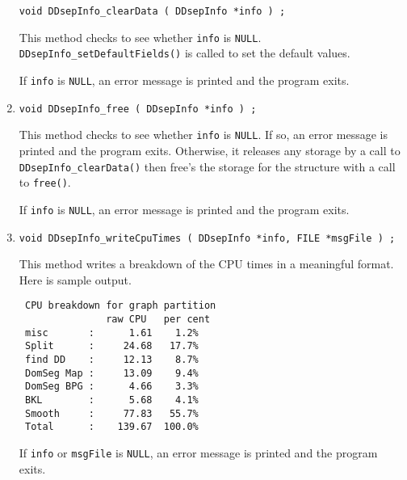 \begin{enumerate}
\begin{verbatim}
void DDsepInfo_clearData ( DDsepInfo *info ) ;
\end{verbatim}
This method checks to see whether {\tt info} is {\tt NULL}.
{\tt DDsepInfo\_setDefaultFields()} is
called to set the default values.
\par {}
If {\tt info} is {\tt NULL},
an error message is printed and the program exits.
\item
\begin{verbatim}
void DDsepInfo_free ( DDsepInfo *info ) ;
\end{verbatim}
This method checks to see whether {\tt info} is {\tt NULL}.
If so, an error message is printed and the program exits.
Otherwise, it releases any storage by a call to 
{\tt DDsepInfo\_clearData()} then free's the storage for the 
structure with a call to {\tt free()}.
\par {}
If {\tt info} is {\tt NULL},
an error message is printed and the program exits.
\item
\begin{verbatim}
void DDsepInfo_writeCpuTimes ( DDsepInfo *info, FILE *msgFile ) ;
\end{verbatim}
This method writes a breakdown of the CPU times in a meaningful
format.
Here is sample output.
\begin{verbatim}
 CPU breakdown for graph partition
               raw CPU   per cent
 misc       :      1.61    1.2%
 Split      :     24.68   17.7%
 find DD    :     12.13    8.7%
 DomSeg Map :     13.09    9.4%
 DomSeg BPG :      4.66    3.3%
 BKL        :      5.68    4.1%
 Smooth     :     77.83   55.7%
 Total      :    139.67  100.0%
\end{verbatim}
\par {}
If {\tt info} or {\tt msgFile} is {\tt NULL},
an error message is printed and the program exits.
\end{enumerate}
